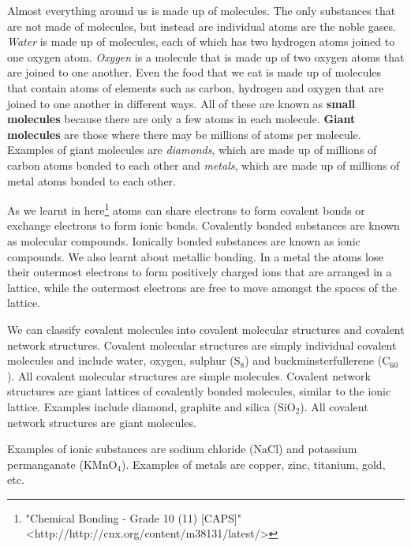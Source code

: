       \label{m38120*id307508}Almost everything around us is made up of molecules. The only substances that are not made of molecules, but instead are individual atoms are the noble gases.
\textsl{Water} is made up of molecules, each of 
which has two hydrogen atoms joined to one oxygen atom. \textsl{Oxygen} is a molecule that is made up of two oxygen 
atoms that are joined to one another. Even the food that we eat is made up of 
molecules that contain atoms of elements such as carbon, hydrogen and oxygen 
that are joined to one another in different ways. All of these are known as 
\textbf{small molecules} because there are only a few 
atoms in each molecule. \textbf{Giant molecules} are 
those where there may be millions of atoms per molecule. Examples of giant 
molecules are \textsl{diamonds}, which are made up 
of millions of carbon atoms bonded to each other and \textsl{metals}, which are made up of millions of metal atoms 
bonded to each other.\par 
      \label{m38120*eip-819}As we learnt in  here\footnote{\raggedright{}"Chemical Bonding - Grade 10 (11) [CAPS]" <http://http://cnx.org/content/m38131/latest/>} atoms can share electrons to form covalent bonds or exchange electrons to form ionic bonds. Covalently bonded substances are known as molecular compounds. Ionically bonded substances are known as ionic compounds. We also learnt about metallic bonding. In a metal the atoms lose their outermost electrons to form positively charged ions that are arranged in a lattice, while the outermost electrons are free to move amongst the spaces of the lattice. \par \label{m38120*eip-394}We can classify covalent molecules into covalent molecular structures and covalent network structures. Covalent molecular structures are simply individual covalent molecules and include water, oxygen, sulphur (\begin{math}{\mathrm{S}}_{8}\end{math}) and buckminsterfullerene (\begin{math}{\mathrm{C}}_{60}\end{math}). All covalent molecular structures are simple molecules. Covalent network structures are giant lattices of covalently bonded molecules, similar to the ionic lattice. Examples include diamond, graphite and silica (\begin{math}{\mathrm{SiO}}_{2}\end{math}). All covalent network structures are giant molecules.\par \label{m38120*eip-860}Examples of ionic substances are sodium chloride (\begin{math}\mathrm{NaCl}\end{math}) and potassium permanganate (\begin{math}{\mathrm{KMnO}}_{4}\end{math}). Examples of metals are copper, zinc, titanium, gold, etc.\par \label{m38120*uid1}
